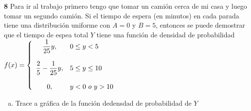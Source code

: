 \documentclass[12pt, letterpaper]{article}
\begin{document}
\textbf{8} Para ir al trabajo primero tengo que tomar un camión cerca de mi casa y luego tomar un segundo camión. Si el tiempo de espera (en minutos) en cada parada tiene una distribución uniforme con $A=0$ y $B=5$, entonces se puede demostrar que el tiempo de espea total $Y$ tiene una función de densidad de probabilidad\vskip0.1cm
$f(x)=\left\{\begin{array}{c l}
	\displaystyle\frac{1}{25}y, & 0\leq y<5\\\\
	\displaystyle\frac{2}{5}-\frac{1}{25}y, & 5\leq y\leq 10\\\\
	0, & y<0\ o\ y>10
\end{array}\right.$
\begin{enumerate}[a)]
	\item Trace a gráfica de la función dedensdad de probabilidad de $Y$\vskip0.1cm
	\begin{center}
\end{center}
\end{enumerate}
\end{document}
